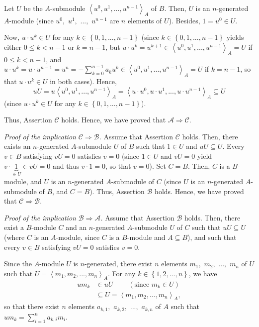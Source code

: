 \documentclass[12pt,final,notitlepage,onecolumn]{article}%
\begin{document}
Let $U$ be the $A$-submodule $\left\langle u^{0},u^{1},...,u^{n-1}%
\right\rangle _{A}$ of $B$. Then, $U$ is an $n$-generated $A$-module (since
$u^{0},$ $u^{1},$ $...,$ $u^{n-1}$ are $n$ elements of $U$). Besides,
$1=u^{0}\in U$.

Now, $u\cdot u^{k}\in U$ for any $k\in\left\{  0,1,...,n-1\right\}  $ (since
$k\in\left\{  0,1,...,n-1\right\}  $ yields either $0\leq k<n-1$ or $k=n-1$,
but $u\cdot u^{k}=u^{k+1}\in\left\langle u^{0},u^{1},...,u^{n-1}\right\rangle
_{A}=U$ if $0\leq k<n-1$, and $u\cdot u^{k}=u\cdot u^{n-1}=u^{n}%
=-\sum\limits_{k=0}^{n-1}a_{k}u^{k}\in\left\langle u^{0},u^{1},...,u^{n-1}%
\right\rangle _{A}=U$ if $k=n-1$, so that $u\cdot u^{k}\in U$ in both cases).
Hence,%
\[
uU=u\left\langle u^{0},u^{1},...,u^{n-1}\right\rangle _{A}=\left\langle u\cdot
u^{0},u\cdot u^{1},...,u\cdot u^{n-1}\right\rangle _{A}\subseteq U
\]
(since $u\cdot u^{k}\in U$ for any $k\in\left\{  0,1,...,n-1\right\}  $).

Thus, Assertion $\mathcal{C}$ holds. Hence, we have proved that $\mathcal{A}%
\Longrightarrow\mathcal{C}$.

\textit{Proof of the implication }$\mathcal{C}\Longrightarrow\mathcal{B}%
$\textit{.} Assume that Assertion $\mathcal{C}$ holds. Then, there exists an
$n$-generated $A$-submodule $U$ of $B$ such that $1\in U$ and $uU\subseteq U$.
Every $v\in B$ satisfying $vU=0$ satisfies $v=0$ (since $1\in U$ and $vU=0$
yield $v\cdot\underbrace{1}_{\in U}\in vU=0$ and thus $v\cdot1=0$, so that
$v=0$). Set $C=B$. Then, $C$ is a $B$-module, and $U$ is an $n$-generated
$A$-submodule of $C$ (since $U$ is an $n$-generated $A$-submodule of $B$, and
$C=B$). Thus, Assertion $\mathcal{B}$ holds. Hence, we have proved that
$\mathcal{C}\Longrightarrow\mathcal{B}$.

\textit{Proof of the implication }$\mathcal{B}\Longrightarrow\mathcal{A}%
$\textit{.} Assume that Assertion $\mathcal{B}$ holds. Then, there exist a
$B$-module $C$ and an $n$-generated $A$-submodule $U$ of $C$ such that
$uU\subseteq U$ (where $C$ is an $A$-module, since $C$ is a $B$-module and
$A\subseteq B$), and such that every $v\in B$ satisfying $vU=0$ satisfies
$v=0$.

Since the $A$-module $U$ is $n$-generated, there exist $n$ elements $m_{1},$
$m_{2},$ $...,$ $m_{n}$ of $U$ such that $U=\left\langle m_{1},m_{2}%
,...,m_{n}\right\rangle _{A}$. For any $k\in\left\{  1,2,...,n\right\}  $, we
have%
\begin{align*}
um_{k}  &  \in uU\ \ \ \ \ \ \ \ \ \ \left(  \text{since }m_{k}\in U\right) \\
&  \subseteq U=\left\langle m_{1},m_{2},...,m_{n}\right\rangle _{A},
\end{align*}
so that there exist $n$ elements $a_{k,1},$ $a_{k,2},$ $...,$ $a_{k,n}$ of $A$
such that $um_{k}=\sum\limits_{i=1}^{n}a_{k,i}m_{i}$.
\end{document}
